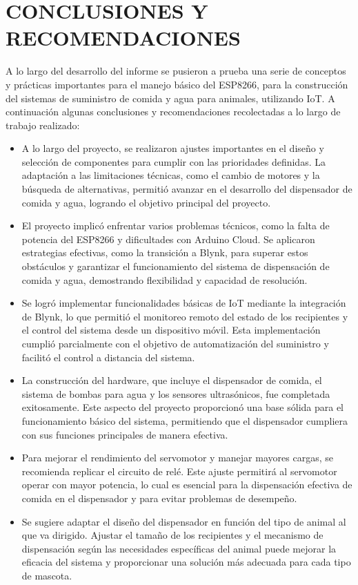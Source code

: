 \newpage
\section{CONCLUSIONES Y RECOMENDACIONES}
A lo largo del desarrollo del informe se pusieron a prueba una serie de conceptos y prácticas importantes para el manejo básico del ESP8266, para la construcción del sistemas de suministro de comida y agua para animales, utilizando IoT. A continuación algunas conclusiones y recomendaciones recolectadas a lo largo de trabajo realizado: 

\begin{itemize}
    \item A lo largo del proyecto, se realizaron ajustes importantes en el diseño y selección de componentes para cumplir con las prioridades definidas. La adaptación a las limitaciones técnicas, como el cambio de motores y la búsqueda de alternativas, permitió avanzar en el desarrollo del dispensador de comida y agua, logrando el objetivo principal del proyecto.

    \item El proyecto implicó enfrentar varios problemas técnicos, como la falta de potencia del ESP8266 y dificultades con Arduino Cloud. Se aplicaron estrategias efectivas, como la transición a Blynk, para superar estos obstáculos y garantizar el funcionamiento del sistema de dispensación de comida y agua, demostrando flexibilidad y capacidad de resolución.
    
    \item Se logró implementar funcionalidades básicas de IoT mediante la integración de Blynk, lo que permitió el monitoreo remoto del estado de los recipientes y el control del sistema desde un dispositivo móvil. Esta implementación cumplió parcialmente con el objetivo de automatización del suministro y facilitó el control a distancia del sistema.

    \item La construcción del hardware, que incluye el dispensador de comida, el sistema de bombas para agua y los sensores ultrasónicos, fue completada exitosamente. Este aspecto del proyecto proporcionó una base sólida para el funcionamiento básico del sistema, permitiendo que el dispensador cumpliera con sus funciones principales de manera efectiva.

    \item Para mejorar el rendimiento del servomotor y manejar mayores cargas, se recomienda replicar el circuito de relé. Este ajuste permitirá al servomotor operar con mayor potencia, lo cual es esencial para la dispensación efectiva de comida en el dispensador y para evitar problemas de desempeño.

    \item Se sugiere adaptar el diseño del dispensador en función del tipo de animal al que va dirigido. Ajustar el tamaño de los recipientes y el mecanismo de dispensación según las necesidades específicas del animal puede mejorar la eficacia del sistema y proporcionar una solución más adecuada para cada tipo de mascota.
\end{itemize} 